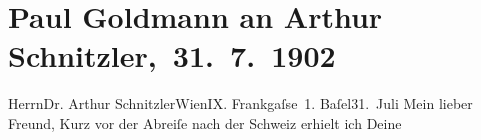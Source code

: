 

         
         \renewcommand{\erwaehntePersonen}{Personen: Maurice Maeterlinck}
         \renewcommand{\erwaehnteInstitutionen}{Institutionen: Deutsches Theater Berlin, Schiller-Theater}
         \renewcommand{\erwaehnteOrte}{Orte: Basel, Berlin, Frankgasse 1, Schweiz, Wien}
         \renewcommand{\erwaehnteWerke}{Werke: Der Schleier der Beatrice. Schauspiel in fünf Akten, Monna Vanna. Schauspiel in drei Akten}
               \section[ Paul Goldmann an Arthur Schnitzler, 31. 7. 1902]{ Paul Goldmann an Arthur Schnitzler, 31. 7. 1902}\nopagebreak{}\rehead{ }\begin{ledgroupsized}[t]{13cm}\normalsize\beginnumbering \toendnotes[C]{\smallbreak\pagebreak[2]} 
\toendnotes[C]{\smallbreak}\pstart{}{\pb}Herrn\pend{}\pstart{}Dr. Arthur Schnitzler\pend{}\pstart{}Wien\pend{}\pstart{}IX. Frankgaſse 1.\pend{}{\bigskip}\pstart
           \centering{}{\pb}Baſel31. Juli\pend
           \pstart
           Mein lieber Freund, Kurz vor der Abreiſe nach der Schweiz erhielt ich Deine \label{K_L03216-1v}\label{K_L03216-1h}

\end{ledgroupsized}

